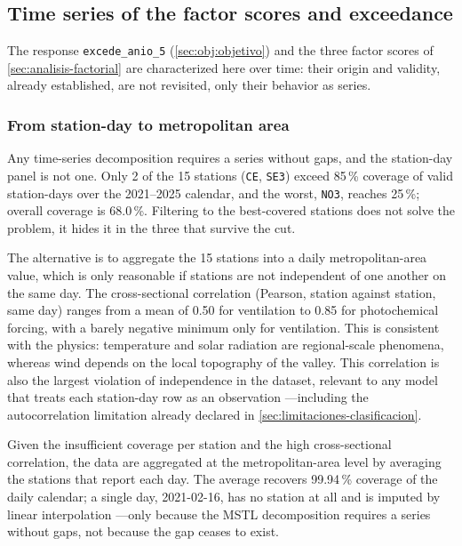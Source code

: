 \subsection{Time series of the factor scores and exceedance}\label{sec:serie-tiempo}

The response \texttt{excede\_anio\_5} (\cref{sec:obj:objetivo}) and the
three factor scores of \cref{sec:analisis-factorial} are characterized here
over time: their origin and validity, already established, are not
revisited, only their behavior as series.

\subsubsection{From station-day to metropolitan area}

Any time-series decomposition requires a series without gaps, and the
station-day panel is not one. Only 2 of the 15 stations (\texttt{CE},
\texttt{SE3}) exceed 85\,\% coverage of valid station-days over the
2021--2025 calendar, and the worst, \texttt{NO3}, reaches 25\,\%; overall
coverage is 68.0\,\%. Filtering to the best-covered stations does not solve
the problem, it hides it in the three that survive the cut.

The alternative is to aggregate the 15 stations into a daily
metropolitan-area value, which is only reasonable if stations are not
independent of one another on the same day. The cross-sectional correlation
(Pearson, station against station, same day) ranges from a mean of 0.50 for
ventilation to 0.85 for photochemical forcing, with a barely negative
minimum only for ventilation. This is consistent with the physics:
temperature and solar radiation are regional-scale phenomena, whereas wind
depends on the local topography of the valley. This correlation is also the
largest violation of independence in the dataset, relevant to any model that
treats each station-day row as an observation ---including the
autocorrelation limitation already declared in
\cref{sec:limitaciones-clasificacion}.

Given the insufficient coverage per station and the high cross-sectional
correlation, the data are aggregated at the metropolitan-area level by
averaging the stations that report each day. The average recovers
99.94\,\% coverage of the daily calendar; a single day, 2021-02-16, has no
station at all and is imputed by linear interpolation ---only because the
MSTL decomposition requires a series without gaps, not because the gap
ceases to exist.

